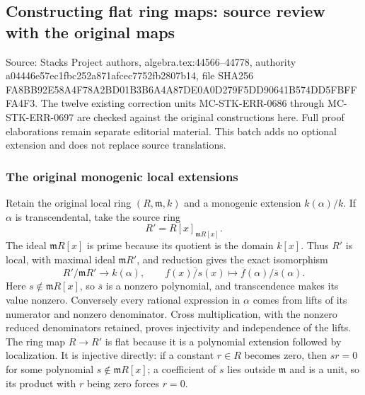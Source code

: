 \subsection{Constructing flat ring maps: source review with the original maps}\label{algebra-proof-064-constructing-flat-ring-maps-source-review-with-the-original-maps}

Source: Stacks Project authors, algebra.tex:44566--44778, authority a044\allowbreak{}46e5\allowbreak{}7ec1\allowbreak{}fbc2\allowbreak{}52a8\allowbreak{}71af\allowbreak{}cec7\allowbreak{}752f\allowbreak{}b280\allowbreak{}7b14, file SHA256 FA8B\allowbreak{}B92E\allowbreak{}58A4\allowbreak{}F78A\allowbreak{}2BD0\allowbreak{}1B3B\allowbreak{}6A4A\allowbreak{}87DE\allowbreak{}0A0D\allowbreak{}279F\allowbreak{}5DD9\allowbreak{}0641\allowbreak{}B574\allowbreak{}DD5F\allowbreak{}BFFF\allowbreak{}A4F3. The twelve existing correction units MC-STK-ERR-0686 through MC-STK-ERR-0697 are checked against the original constructions here. Full proof elaborations remain separate editorial material. This batch adds no optional extension and does not replace source translations.

\subsubsection{The original monogenic local extensions}\label{algebra-proof-064-the-original-monogenic-local-extensions}

Retain the original local ring \((R,\mathfrak m,k)\) and a monogenic extension \(k(\alpha)/k\). If \(\alpha\) is transcendental, take the source ring \[
 R'=R[x]_{\mathfrak mR[x]}.
\] The ideal \(\mathfrak mR[x]\) is prime because its quotient is the domain \(k[x]\). Thus \(R'\) is local, with maximal ideal \(\mathfrak mR'\), and reduction gives the exact isomorphism \[
 R'/\mathfrak mR'\longrightarrow k(\alpha),\qquad
 \overline{f(x)/s(x)}\longmapsto \overline f(\alpha)/\overline s(\alpha).
\] Here \(s\notin\mathfrak mR[x]\), so \(\overline s\) is a nonzero polynomial, and transcendence makes its value nonzero. Conversely every rational expression in \(\alpha\) comes from lifts of its numerator and nonzero denominator. Cross multiplication, with the nonzero reduced denominators retained, proves injectivity and independence of the lifts. The ring map \(R\to R'\) is flat because it is a polynomial extension followed by localization. It is injective directly: if a constant \(r\in R\) becomes zero, then \(sr=0\) for some polynomial \(s\notin\mathfrak mR[x]\); a coefficient of \(s\) lies outside \(\mathfrak m\) and is a unit, so its product with \(r\) being zero forces \(r=0\).

